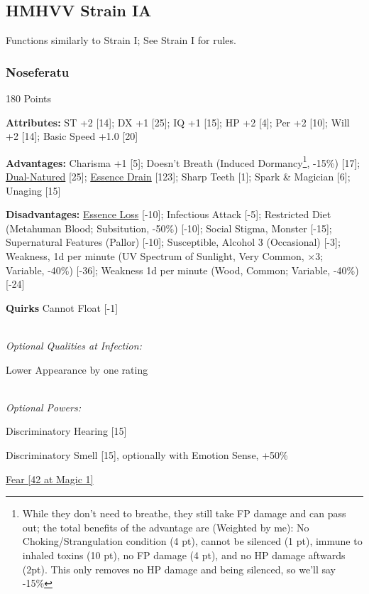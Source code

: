 \begin{multicols*}{3}
	\subsection*{HMHVV Strain IA}
	
	Functions similarly to Strain I; See Strain I for rules.
	
	\subsubsection{Noseferatu}
	\begin{flushright}
		180 Points
	\end{flushright}
	
	\textbf{Attributes:}
	ST +2 [14]; DX +1 [25]; IQ +1 [15]; HP +2 [4]; Per +2 [10]; Will +2 [14]; Basic Speed +1.0 [20]
	
	\textbf{Advantages:}
	Charisma +1 [5]; Doesn't Breath (Induced Dormancy\footnote{While they don't need to breathe, they still take FP damage and can pass out; the total benefits of the advantage are (Weighted by me): No Choking/Strangulation condition (4 pt), cannot be silenced (1 pt), immune to inhaled toxins (10 pt), no FP damage (4 pt), and no HP damage aftwards (2pt). This only removes no HP damage and being silenced, so we'll say -15\%}, -15\%) [17]; \hyperref[dual_natured]{Dual-Natured} [25];  \hyperref[essence_drain]{Essence Drain} [123]; Sharp Teeth [1]; Spark \& Magician [6]; Unaging [15]
	
	\textbf{Disadvantages:}	
	\hyperref[essence_loss]{Essence Loss} [-10]; Infectious Attack [-5]; Restricted Diet (Metahuman Blood; Subsitution, -50\%) [-10]; Social Stigma, Monster [-15];  Supernatural Features (Pallor) [-10]; Susceptible, Alcohol 3 (Occasional) [-3]; Weakness, 1d per minute (UV Spectrum of Sunlight, Very Common, $\times$3; Variable, -40\%) [-36]; Weakness 1d per minute (Wood, Common; Variable, -40\%) [-24]
	
	\textbf{Quirks} 
	Cannot Float [-1]
	
	\textit{\\Optional Qualities at Infection:}
	
	Lower Appearance by one rating	
	
	\textit{\\Optional Powers:}
	
	Discriminatory Hearing [15]
	
	Discriminatory Smell [15], optionally with Emotion Sense, +50\%
	
	\hyperref[fear]{Fear [42 at Magic 1]}
	

\end{multicols*}
